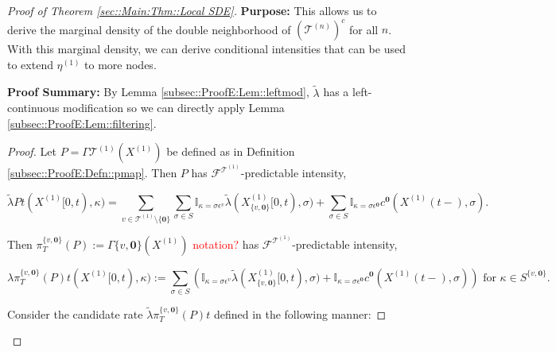 \documentclass[12pt]{article}
\newcommand{\mb}{\mathbb}
\newcommand{\mc}{\mathcal}
\newcommand{\te}{\text}
\newcommand{\ep}{\epsilon}
\newcommand{\tr}{\textcolor{red}}
\newcommand{\purpose}{\textbf{Purpose: }}
\newcommand{\pfsum}{\textbf{Proof Summary: }}
\newcommand{\defeq}{:=}								%
\renewcommand{\root}{\mathbf{0}}				%
\renewcommand{\v}{v}							%
\renewcommand{\S}{S}							%
\newcommand{\s}{\sigma}							%
\newcommand{\ev}{\ep}							%
\newcommand{\T}{T}								%
\renewcommand{\t}{t}							%
\newcommand{\proj}{\pi}							%
\newcommand{\F}{\mc{F}}							%
\newcommand{\X}{X}								%
\newcommand{\IGr}{c}							%
\newcommand{\vind}[1]{^{#1}}					%
\newcommand{\carp}[1]{^{#1}}					%
\newcommand{\vsi}[1]{^{#1}}						%
\newcommand{\cind}[1]{_{#1}}					%
\newcommand{\tp}[1]{(#1)}						%
\newcommand{\tip}[1]{#1}						%
\newcommand{\ts}[1]{_{#1}}						%
\newcommand{\tree}{\mc{T}}						%
\newcommand{\sln}[1]{^{(#1)}}					%
\newcommand{\rate}{\lambda}						%
\newcommand{\alt}[1]{\widetilde{#1}}			%
\newcommand{\mmm}{\eta}							%
\newcommand{\pmap}{\Gamma}						%
\renewcommand{\mark}{\kappa}					%
\newcommand{\rp}{P}								%
\newcommand{\crate}{\alt{\lambda}}				%
\begin{document}
\begin{proof}[Proof of Theorem \ref{sec::Main:Thm::Local SDE}]
\purpose This allows us to derive the marginal density of the double neighborhood of \((\tree\sln{n})^c\) for all \(n\). With this marginal density, we can derive conditional intensities that can be used to extend \(\mmm\sln{1}\ts{}\) to more nodes.

\pfsum By Lemma \ref{subsec::ProofE:Lem::leftmod}, \(\crate{}{}\) has a left-continuous modification so we can directly apply Lemma \ref{subsec::ProofE:Lem::filtering}.

\begin{proof}
Let \(\rp{} = \pmap{\tree\sln{1}}(\X\sln{1}\cind{}\tip{})\) be defined as in Definition \ref{subsec::ProofE:Defn::pmap}. Then \(\rp{}\) has \(\F\vsi{\tree\sln{1}}\ts{}\)-predictable intensity,

\[\crate{\rp{}}{\t}(\X\sln{1}\cind{}\tip{[0,\t)},\mark{}) = \sum_{\v\in \tree\sln{1}\setminus\{\root\}}\sum_{\s\in \S} \mb{I}_{\mark{} = \s\ev\vind{\v}}\crate{}{}(\X\sln{1}\cind{\{\v,\root\}}\tip{[0,\t)},\s) + \sum_{\s\in\S}\mb{I}_{\mark{} = \s\ev\vind{\root}}\IGr\vind{\root}(\X\sln{1}\cind{}\tp{\t-},\s).\]

Then \(\proj\vsi{\{\v,\root\}}\ts{\T}(\rp{})\defeq \pmap{\{\v,\root\}}(\X\sln{1}\cind{}\tip{})\) \tr{notation?} has \(\F\vsi{\tree\sln{1}}\ts{}\)-predictable intensity,

\[\rate{\proj\vsi{\{\v,\root\}}\ts{\T}(\rp{})}{\t}(\X\sln{1}\cind{}\tip{[0,\t)},\mark{}) \defeq \sum_{\s\in \S} \left(\mb{I}_{\mark{} = \s\ev\vind{\v}}\crate{}{}(\X\sln{1}\cind{\{\v,\root\}}\tip{[0,\t)},\s) + \mb{I}_{\mark{} = \s\ev\vind{\root}}\IGr\vind{\root}(\X\sln{1}\cind{}\tp{\t-},\s)\right)\te{ for } \kappa \in \S\carp{\{\v,\root\}}.\]

Consider the candidate rate \(\crate{\proj\vsi{\{\v,\root\}}\ts{\T}(\rp{})}{\t}\) defined in the following manner:


\end{proof}
\end{proof}
\end{document}
